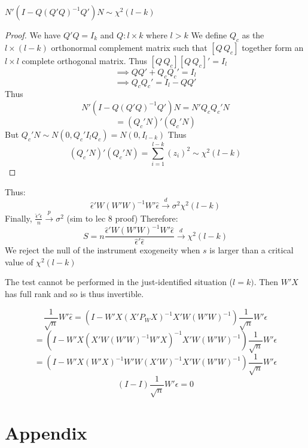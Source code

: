 \documentclass[DIV=14,titlepage=false]{scrreprt}
\begin{document}
\begin{lemma}
    \(N'(I-Q(Q'Q)^{-1}Q') N\sim\chi^2(l-k)\)
\end{lemma}
\vspace{5mm}
\begin{proof}
We have \(Q'Q=I_k\) and \(Q: l\times k\) where \(l>k\)
We define \(Q_c\) as the \(l\times (l-k)\) orthonormal complement matrix such that \([Q \, Q_c]\) together form an \(l\times l\) complete orthogonal matrix.
Thus \([Q \, Q_c][Q \, Q_c]'=I_l\)
\[\implies QQ' + Q_cQ_c'=I_l\]
\[\implies Q_cQ_c'=I_l-QQ'\]
Thus \[N'(I-Q(Q'Q)^{-1}Q') N= N'Q_cQ_c'N\]
\[=(Q_c'N)'(Q_c'N)\]
But \(Q_c'N \sim N(0,Q_c'I_lQ_c)=N(0,I_{l-k})\)
Thus \[(Q_c'N)'(Q_c'N)=\sum_{i=1}^{l-k}(z_i)^2\sim\chi^2(l-k)\]
\end{proof}

Thus:
\[\hat\epsilon'W(W'W)^{-1}W'\hat\epsilon\xrightarrow{d}\sigma^2\chi^2(l-k)\]
Finally, \(\frac{\hat\epsilon'\hat\epsilon}{n}\xrightarrow{p}\sigma^2\) (sim to lec 8 proof)
Therefore:
\[S=n\frac{\hat\epsilon'W(W'W)^{-1}W'\hat\epsilon}{\hat\epsilon'\hat\epsilon}\xrightarrow{d}\chi^2(l-k)\]
We reject the null of the instrument exogeneity when \(s\) is larger than a critical value of \(\chi^2(l-k)\)
\begin{note}
The test cannot be performed in the just-identified situation (\(l=k)\).
Then \(W'X\) has full rank and so is thus invertible.

\[\frac{1}{\sqrt{n}}W'\hat\epsilon=(I-W'X(X'P_WX)^{-1}X'W(W'W)^{-1})\frac{1}{\sqrt{n}}W'\epsilon\]
\[=(I-W'X(X'W(W'W)^{-1}W'X)^{-1}X'W(W'W)^{-1})\frac{1}{\sqrt{n}}W'\epsilon\]
\[=(I-W'X(W'X)^{-1}W'W(X'W)^{-1}X'W(W'W)^{-1})\frac{1}{\sqrt{n}}W'\epsilon\]
\[(I-I)\frac{1}{\sqrt{n}}W'\epsilon=0\]

\end{note}
\section{Appendix}
\end{document}
